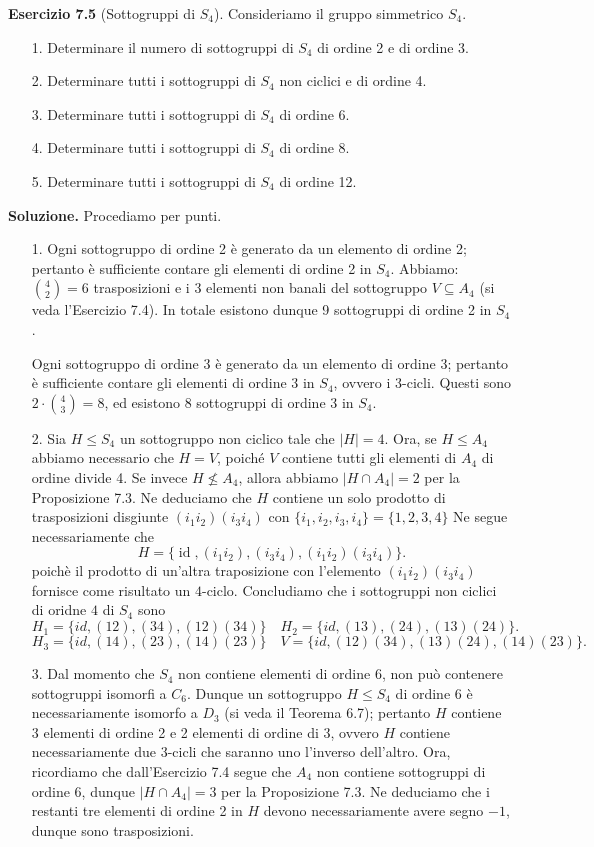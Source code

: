 \documentclass[12px]{article}
\begin{document}
\textbf{Esercizio 7.5} (Sottogruppi di $S_4$). Consideriamo il gruppo simmetrico $S_4$.
\begin{enumerate}
    \item[1.] Determinare il numero di sottogruppi di $S_4$ di ordine 2 e di ordine 3.
    \item[2.] Determinare tutti i sottogruppi di $S_4$ non ciclici e di ordine 4.
    \item[3.] Determinare tutti i sottogruppi di $S_4$ di ordine 6.
    \item[4.] Determinare tutti i sottogruppi di $S_4$ di ordine 8.
    \item[5.] Determinare tutti i sottogruppi di $S_4$ di ordine 12.
\end{enumerate}
\textbf{Soluzione.} Procediamo per punti.
\begin{enumerate}
	\item[1.] Ogni sottogruppo di ordine 2 è generato da un elemento di ordine 2; pertanto è sufficiente contare gli elementi di ordine 2 in $S_4$. Abbiamo: $ {4 \choose 2} = 6$ trasposizioni e i 3 elementi non banali del sottogruppo $V \subseteq A_4$ (si veda l'Esercizio 7.4). In totale esistono dunque 9 sottogruppi di ordine 2 in $S_4$.

	Ogni sottogruppo di ordine 3 è generato da un elemento di ordine 3; pertanto è sufficiente contare gli elementi di ordine 3 in $S_4$, ovvero i $3$-cicli. Questi sono $2 \cdot {4 \choose 3} = 8$, ed esistono 8 sottogruppi di ordine 3 in $S_4$.

\item[2.] Sia $H \leq S_4$ un sottogruppo non ciclico tale che $\lvert H \rvert = 4$. Ora, se $H \leq A_4$ abbiamo necessario che $H = V$, poiché $V$ contiene tutti gli elementi di $A_4$ di ordine divide 4. Se invece $H \not\leq A_4$, allora abbiamo $\lvert H \cap A_4 \rvert = 2$ per la Proposizione 7.3. Ne deduciamo che $H$ contiene un solo prodotto di trasposizioni disgiunte $(i_1 i_2)(i_3 i_4)$ con $\{i_1,i_2,i_3,i_4\} = \{1,2,3,4\}$ Ne segue necessariamente che \[H = \{ \operatorname{id}, (i_1 i_2), (i_3 i_4), (i_1 i_2)(i_3 i_4)\}.\]
	poichè il prodotto di un'altra traposizione con l'elemento $(i_1i_2)(i_3i_4)$ fornisce come risultato un $4$-ciclo. Concludiamo che i sottogruppi non ciclici di oridne $4$ di $S_4$ sono
	\[
		H_1 = \{id, (12),(34),(12)(34)\}\quad H_2 = \{id, (13),(24),(13)(24)\}
	.\] 
	\[
	H_3 = \{id, (14),(23),(14)(23)\}\quad V = \{id, (12)(34),(13)(24),(14)(23)\}
	.\] 

    \item[3.] Dal momento che $S_4$ non contiene elementi di ordine 6, non può contenere sottogruppi isomorfi a $C_6$. Dunque un sottogruppo $H \leq S_4$ di ordine 6 è necessariamente isomorfo a $D_3$ (si veda il Teorema 6.7); pertanto $H$ contiene 3 elementi di ordine 2 e 2 elementi di ordine di 3, ovvero $H$ contiene necessariamente due $3$-cicli che saranno uno l’inverso dell’altro.
Ora, ricordiamo che dall’Esercizio 7.4 segue che $A_4$ non contiene sottogruppi di ordine 6, dunque 
$\lvert H \cap A_4 \rvert = 3$ per la Proposizione 7.3. Ne deduciamo che i restanti tre elementi di ordine 2 in $H$ devono necessariamente avere segno $-1$, dunque sono trasposizioni.


\end{enumerate}
\end{document}
